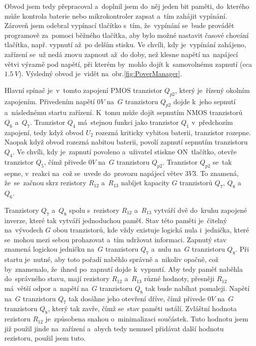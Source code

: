 Obvod jsem tedy přepracoval a~doplnil jsem do~něj jeden bit paměti, do~kterého může kontrola baterie nebo mikrokontroler zapsat a~tím zahájit vypínání.
Zároveň jsem odebral vypínací tlačítko s~tím, že~vypínání se~bude provádět programově za~pomoci běžného tlačítka, aby bylo možné nastavit časové chování tlačítka, např. vypnutí až~po delším stisku. 
Ve chvíli, kdy je~vypínání zahájeno, zařízení se~už nedá znovu zapnout až~do doby, než klesne napětí na~napájecí větvi výrazně pod napětí, při kterém by~mohlo dojít k~samovolnému zapnutí (cca \(1.5~V\)).
Výsledný obvod je~vidět na~obr.\ref{fig:PoverManager}.

Hlavní spínač je~v~tomto zapojení PMOS tranzistor \(Q_{p2}\), který je~řízený okolním zapojením.
Přivedením napětí \(0 V\) na~\(G\) tranzistoru \(Q_{p2}\) dojde k~jeho sepnutí a~následnému startu zařízení.
K~tomu může dojít sepnutím NMOS tranzistorů \(Q_{6}\) a~\(Q_{7}\).
Tranzistor \(Q_{4}\) má~stejnou funkci jako tranzistor \(Q_{1}\) v~předchozím zapojení, tedy když obvod \(U_{2}\) rozezná kriticky vybitou baterii, tranzistor rozepne.
Naopak když obvod rozezná nabitou baterii, povolí zapnutí sepnutím tranzistoru \(Q_{4}\).
Ve chvíli, kdy je~zapnutí povoleno a~uživatel stiskne ON~tlačítko, otevře tranzistor \(Q_{5}\), čímž přivede \(0 V\) na~\(G\) tranzistoru \(Q_{p2}\).
Tranzistor \(Q_{p2}\) se~tak sepne, v~reakci na~což se~uvede do~provozu napájecí větev \(3V3\).
To znamená, že~se~začnou skrz rezistory \(R_{12}\) a~\(R_{13}\) nabíjet kapacity \(G\) tranzistorů \(Q_{7}\), \(Q_{8}\) a~\(Q_{6}\).

Tranzistory \(Q_{7}\) a~\(Q_{8}\) spolu s~rezistory \(R_{12}\) a~\(R_{13}\) vytváří dvě do~kruhu zapojené inverze, které tak vytváří jednoduchou paměť.
Stav této paměti je~čitelný na~vývodech \(G\) obou tranzistorů, kde vždy existuje logická nula i~jednička, které se~mohou mezi sebou prohazovat a~tím udržovat informaci.
Zapnutý stav znamená logickou jedničku na~\(G\) tranzistoru \(Q_{7}\) a~nulu na~\(G\) tranzistoru \(Q_{8}\).
Při startu je~nutné, aby toto pořadí naběhlo správně a~nikoliv opačně, což by~znamenalo, že~ihned po~zapnutí dojde k~vypnutí.
Aby tedy paměť naběhla do~správného stavu, mají rezistory \(R_{12}\) a~\(R_{13}\) různé hodnoty, přesněji \(R_{12}\) má~větší odpor a~napětí na~\(G\) tranzistoru \(Q_{8}\) tak bude nabíhat pomaleji.
Napětí na~\(G\) tranzistoru \(Q_{7}\) tak dosáhne jeho otevření dříve, čímž přivede \(0 V\) na~\(G\) tranzistoru \(Q_{8}\), který tak zavře, čímž se~stav paměti ustálí.
Zvláštní hodnota rezistoru \(R_{12}\) je~způsobena snahou o~minimalizaci součástek.
Tuto hodnotu jsem již použil jinde na~zařízení a~abych tedy nemusel přidávat další hodnotu rezistoru, použil jsem tuto.

